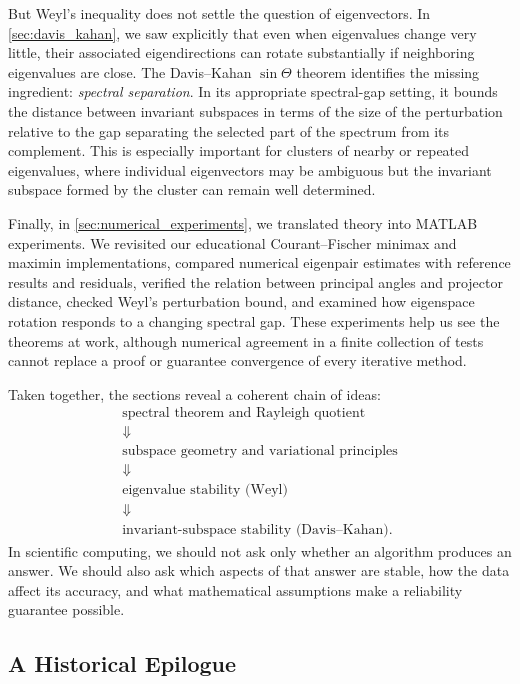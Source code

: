 \documentclass[14pt,letterpaper]{article}
\theoremstyle{plain}
\theoremstyle{definition}
\theoremstyle{remark}
\begin{document}
But Weyl's inequality does not settle the question of
eigenvectors. In \cref{sec:davis_kahan}, we saw explicitly
that even when eigenvalues change very little, their
associated eigendirections can rotate substantially if
neighboring eigenvalues are close. The Davis--Kahan
$\sin\Theta$ theorem identifies the missing ingredient:
\emph{spectral separation}. In its appropriate
spectral-gap setting, it bounds the distance between
invariant subspaces in terms of the size of the perturbation
relative to the gap separating the selected part of the
spectrum from its complement. This is especially important
for clusters of nearby or repeated eigenvalues, where
individual eigenvectors may be ambiguous but the invariant
subspace formed by the cluster can remain well determined.

Finally, in \cref{sec:numerical_experiments}, we translated
theory into MATLAB experiments. We revisited our educational
Courant--Fischer minimax and maximin implementations,
compared numerical eigenpair estimates with reference
results and residuals, verified the relation between
principal angles and projector distance, checked Weyl's
perturbation bound, and examined how eigenspace rotation
responds to a changing spectral gap. These experiments
help us see the theorems at work, although numerical
agreement in a finite collection of tests cannot replace
a proof or guarantee convergence of every iterative method.

Taken together, the sections reveal a coherent chain of
ideas:
\[
\boxed{
\begin{gathered}
\text{spectral theorem and Rayleigh quotient}\\
\Downarrow\\
\text{subspace geometry and variational principles}\\
\Downarrow\\
\text{eigenvalue stability (Weyl)}\\
\Downarrow\\
\text{invariant-subspace stability (Davis--Kahan).}
\end{gathered}
}
\]
In scientific computing, we should not ask only whether an
algorithm produces an answer. We should also ask which
aspects of that answer are stable, how the data affect its
accuracy, and what mathematical assumptions make a
reliability guarantee possible.

\subsection{A Historical Epilogue}
\end{document}
